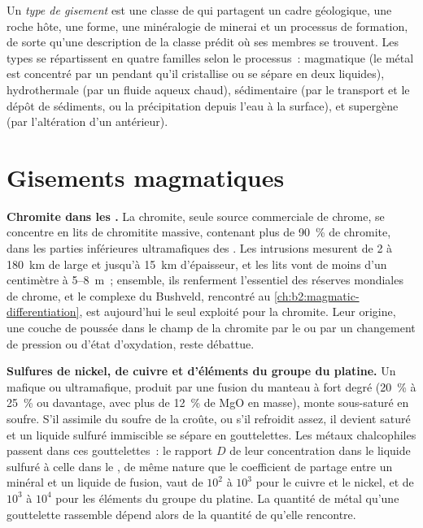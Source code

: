 \begin{definition}\label{def:b2:ore-deposits:types}
Un \emph{type de gisement} est une classe de  qui partagent un
cadre géologique, une roche hôte, une forme, une minéralogie de minerai et un processus de
formation, de sorte qu'une description de la classe prédit où ses membres se trouvent. Les types se
répartissent en quatre familles selon le processus~: magmatique (le métal est concentré par un 
pendant qu'il cristallise ou se sépare en deux liquides), hydrothermale (par un fluide aqueux chaud),
sédimentaire (par le transport et le dépôt de sédiments, ou la précipitation depuis l'eau à la
surface), et supergène (par l'altération d'un  antérieur).
\end{definition}

\section{Gisements magmatiques}\label{sec:b2:ore-deposits:magmatic}

\textbf{Chromite dans les .} La chromite, seule source commerciale de chrome,
se concentre en lits de chromitite massive, contenant plus de \qty{90}{\percent} de chromite, dans
les parties inférieures ultramafiques des . Les intrusions mesurent de 2 à
\qty{180}{km} de large et jusqu'à \qty{15}{km} d'épaisseur, et les lits vont de moins d'un
centimètre à 5--\qty{8}{m}~; ensemble, ils renferment l'essentiel des réserves mondiales de chrome,
et le complexe du Bushveld, rencontré au \cref{ch:b2:magmatic-differentiation}, est aujourd'hui le
seul exploité pour la chromite. Leur origine, une couche de  poussée dans le champ de la
chromite par le  ou par un changement de pression ou d'état d'oxydation, reste débattue.

\textbf{Sulfures de nickel, de cuivre et d'éléments du groupe du platine.} Un  mafique ou ultramafique, produit
par une fusion du manteau à fort degré (\qty{20}{\percent} à \qty{25}{\percent} ou davantage, avec plus de
\qty{12}{\percent} de MgO en masse), monte sous-saturé en soufre. S'il assimile du soufre de la croûte, ou s'il
refroidit assez, il devient saturé et un liquide sulfuré immiscible se sépare en gouttelettes. Les métaux chalcophiles
passent dans ces gouttelettes~: le rapport $D$ de leur concentration dans le liquide sulfuré à celle dans
le , de même nature que le coefficient de partage entre un minéral et un liquide de fusion,
vaut de $10^2$ à $10^3$ pour le cuivre et le nickel, et de $10^3$ à $10^4$ pour les éléments du groupe du platine.
La quantité de métal qu'une gouttelette rassemble dépend alors de la quantité de  qu'elle rencontre.

